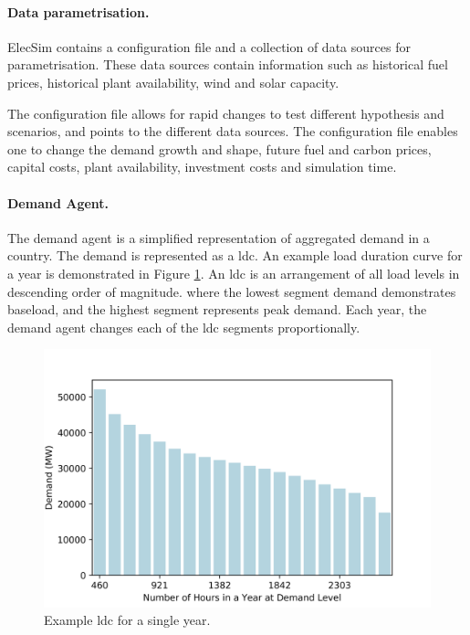 \paragraph{Data parametrisation.} ElecSim contains a configuration file and a collection of data sources for parametrisation. These data sources contain information such as historical fuel prices, historical plant availability, wind and solar capacity.

The configuration file allows for rapid changes to test different hypothesis and scenarios, and points to the different data sources. The configuration file enables one to change the demand growth and shape, future fuel and carbon prices, capital costs, plant availability, investment costs and simulation time.

\paragraph{Demand Agent.} The demand agent is a simplified representation of aggregated demand in a country. The demand is represented as a \gls{ldc}. An example load duration curve for a year is demonstrated in Figure \ref{fig:loaddurationcurve}. An \acrshort{ldc} is an arrangement of all load levels in descending order of magnitude. where the lowest segment demand demonstrates baseload, and the highest segment represents peak demand. Each year, the demand agent changes each of the \acrshort{ldc} segments proportionally.

\begin{figure}
	\centering
	\includegraphics[width=0.95\linewidth]{Chapter4/figures/load_duration_curve}
	\caption{Example \acrfull{ldc} for a single year.}
	\label{fig:loaddurationcurve}
\end{figure}


